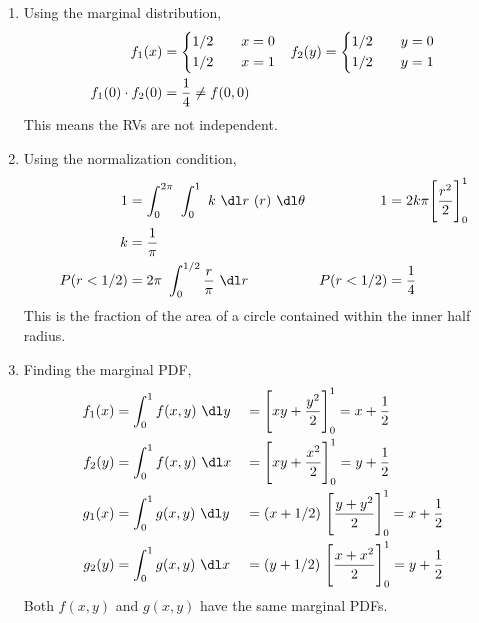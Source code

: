 \begin{enumerate}
    \item Using the marginal distribution,
          \begin{align}
              f_1(x)              & = \begin{dcases}
                                          1/2 & \quad x = 0 \\
                                          1/2 & \quad x = 1 \\
                                      \end{dcases}      &
              f_2(y)              & = \begin{dcases}
                                          1/2 & \quad y = 0 \\
                                          1/2 & \quad y = 1 \\
                                      \end{dcases}       \\
              f_1(0) \cdot f_2(0) & = \frac{1}{4} \neq f(0,0)
          \end{align}
          This means the RVs are not independent.

    \item Using the normalization condition,
          \begin{align}
              1            & = \int_{0}^{2\pi}\ \int_{0}^{1}\ k\ \dl r\ (r)
              \ \dl \theta &
              1            & = 2k\pi \Bigg[\frac{r^2}{2}\Bigg]_0^1            \\
              k            & = \frac{1}{\pi}                                  \\
              P(r < 1/2)   & = 2\pi\ \int_{0}^{1/2} \frac{r}{\pi}\ \dl r    &
              P(r < 1/2)   & = \frac{1}{4}
          \end{align}
          This is the fraction of the area of a circle contained within the inner half
          radius.

    \item Finding the marginal PDF,
          \begin{align}
              f_1(x) & = \int_{0}^{1} f(x, y)\ \dl y                           &
                     & = \Bigg[xy + \frac{y^2}{2} \Bigg]_0^1 = x + \frac{1}{2}   \\
              f_2(y) & = \int_{0}^{1} f(x, y)\ \dl x                           &
                     & = \Bigg[xy + \frac{x^2}{2} \Bigg]_0^1 = y + \frac{1}{2}   \\
              g_1(x) & = \int_{0}^{1} g(x, y)\ \dl y                           &
                     & = (x+1/2)\ \Bigg[\frac{y + y^2}{2} \Bigg]_0^1
              = x + \frac{1}{2}                                                  \\
              g_2(y) & = \int_{0}^{1} g(x, y)\ \dl x                           &
                     & = (y+1/2)\ \Bigg[\frac{x + x^2}{2} \Bigg]_0^1
              = y + \frac{1}{2}
          \end{align}
          Both $ f(x, y) $ and $ g(x,y) $ have the same marginal PDFs.


\end{enumerate}
